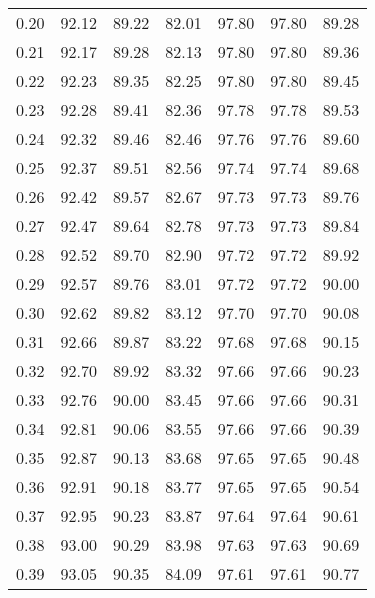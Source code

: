 \begin{tabular}{|c|c|c|c|c|c|c|}
      0.20 &     92.12 &     89.22 &      82.01 &   97.80 &      97.80 &         89.28 \\
      0.21 &     92.17 &     89.28 &      82.13 &   97.80 &      97.80 &         89.36 \\
      0.22 &     92.23 &     89.35 &      82.25 &   97.80 &      97.80 &         89.45 \\
      0.23 &     92.28 &     89.41 &      82.36 &   97.78 &      97.78 &         89.53 \\
      0.24 &     92.32 &     89.46 &      82.46 &   97.76 &      97.76 &         89.60 \\
      0.25 &     92.37 &     89.51 &      82.56 &   97.74 &      97.74 &         89.68 \\
      0.26 &     92.42 &     89.57 &      82.67 &   97.73 &      97.73 &         89.76 \\
      0.27 &     92.47 &     89.64 &      82.78 &   97.73 &      97.73 &         89.84 \\
      0.28 &     92.52 &     89.70 &      82.90 &   97.72 &      97.72 &         89.92 \\
      0.29 &     92.57 &     89.76 &      83.01 &   97.72 &      97.72 &         90.00 \\
      0.30 &     92.62 &     89.82 &      83.12 &   97.70 &      97.70 &         90.08 \\
      0.31 &     92.66 &     89.87 &      83.22 &   97.68 &      97.68 &         90.15 \\
      0.32 &     92.70 &     89.92 &      83.32 &   97.66 &      97.66 &         90.23 \\
      0.33 &     92.76 &     90.00 &      83.45 &   97.66 &      97.66 &         90.31 \\
      0.34 &     92.81 &     90.06 &      83.55 &   97.66 &      97.66 &         90.39 \\
      0.35 &     92.87 &     90.13 &      83.68 &   97.65 &      97.65 &         90.48 \\
      0.36 &     92.91 &     90.18 &      83.77 &   97.65 &      97.65 &         90.54 \\
      0.37 &     92.95 &     90.23 &      83.87 &   97.64 &      97.64 &         90.61 \\
      0.38 &     93.00 &     90.29 &      83.98 &   97.63 &      97.63 &         90.69 \\
      0.39 &     93.05 &     90.35 &      84.09 &   97.61 &      97.61 &         90.77 \\

\end{tabular}
